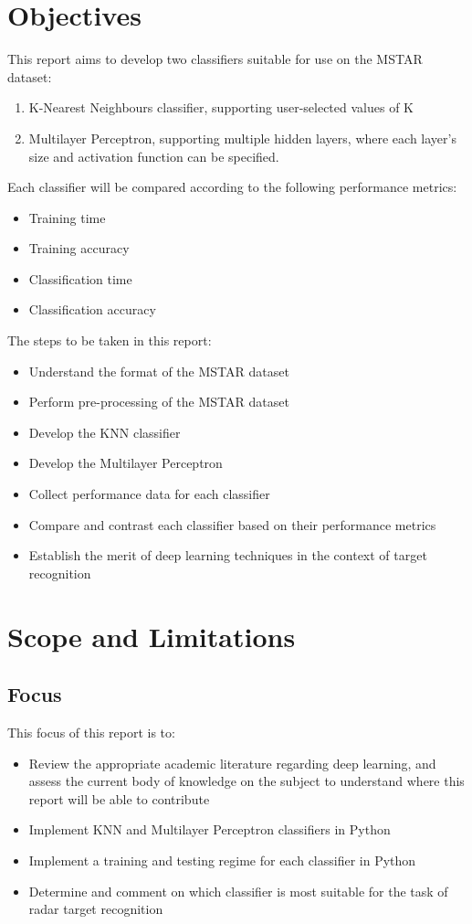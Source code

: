 \section{Objectives}

This report aims to develop two classifiers suitable for use on the MSTAR dataset: 

\begin{enumerate}
	\item K-Nearest Neighbours classifier, supporting user-selected values of K
	\item Multilayer Perceptron, supporting multiple hidden layers, where each layer's size and activation function can be specified.
\end{enumerate}

Each classifier will be compared according to the following performance metrics:
\begin{itemize}
	\item Training time
	\item Training accuracy
	\item Classification time
	\item Classification accuracy
\end{itemize}

The steps to be taken in this report:
\begin{itemize}
	\item Understand the format of the MSTAR dataset
	\item Perform pre-processing of the MSTAR dataset
	\item Develop the KNN classifier
	\item Develop the Multilayer Perceptron
	\item Collect performance data for each classifier
	\item Compare and contrast each classifier based on their performance metrics
	\item Establish the merit of deep learning techniques in the context of target recognition
\end{itemize}



\section{Scope and Limitations}

\subsection{Focus}
This focus of this report is to:
\begin{itemize}
	\item Review the appropriate academic literature regarding deep learning, and assess the current body of knowledge on the subject to understand where this report will be able to contribute
	\item Implement KNN and Multilayer Perceptron classifiers in Python
	\item Implement a training and testing regime for each classifier in Python
	\item Determine and comment on which classifier is most suitable for the task of radar target recognition
\end{itemize}


